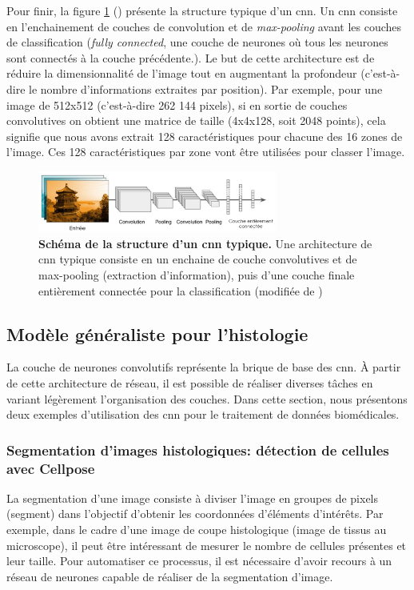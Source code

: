 Pour finir, la figure \ref{fig:cnn_archi} (\cite{aurelien_geron_hands-machine_2019}) présente la structure typique d'un \gls{cnn}. Un \gls{cnn} consiste en l'enchainement de couches de convolution et de \textit{max-pooling} avant les couches de classification (\textit{fully connected}, une couche de neurones où tous les neurones sont connectés à la couche précédente.). Le but de cette architecture est de réduire la dimensionnalité de l'image tout en augmentant la profondeur (c'est-à-dire le nombre d'informations extraites par position). Par exemple, pour une image de 512x512 (c'est-à-dire 262 144 pixels), si en sortie de couches convolutives on obtient une matrice de taille (4x4x128, soit 2048 points), cela signifie que nous avons extrait 128 caractéristiques pour chacune des 16 zones de l'image. Ces 128 caractéristiques par zone vont être utilisées pour classer l'image.
\begin{figure}[!ht]
 \centering
 \includegraphics[width=0.7\textwidth]{figures/cnn_simple.png}
 \caption[Schéma de la structure d'un \gls{cnn} typique]{\textbf{Schéma de la structure d'un \gls{cnn} typique. } Une architecture de \gls{cnn} typique consiste en un enchaine de couche convolutives et de max-pooling (extraction d'information), puis d'une couche finale entièrement connectée pour la classification (modifiée de \cite{aurelien_geron_hands-machine_2019})}
 \label{fig:cnn_archi}
\end{figure}
\subsection{Modèle généraliste pour l'histologie}
La couche de neurones convolutifs représente la brique de base des \gls{cnn}. À partir de cette architecture de réseau, il est possible de réaliser diverses tâches en variant légèrement l'organisation des couches. Dans cette section, nous présentons deux exemples d'utilisation des \gls{cnn} pour le traitement de données biomédicales.

\subsubsection{Segmentation d'images histologiques: détection de cellules avec Cellpose}
La segmentation d'une image consiste à diviser l'image en groupes de pixels (segment) dans l'objectif d'obtenir les coordonnées d'éléments d'intérêts. Par exemple, dans le cadre d'une image de coupe histologique (image de tissus au microscope), il peut être intéressant de mesurer le nombre de cellules présentes et leur taille. Pour automatiser ce processus, il est nécessaire d'avoir recours à un réseau de neurones capable de réaliser de la segmentation d'image.


